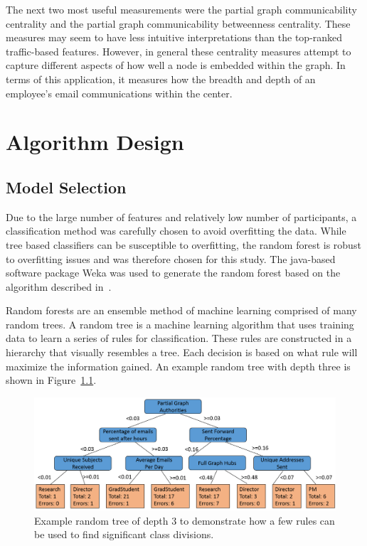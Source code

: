 \documentclass[12pt]{report}
\begin{document}
The next two most useful measurements were the partial graph communicability centrality and the partial graph communicability betweenness centrality.
These measures may seem to have less intuitive interpretations than the top-ranked traffic-based features.
However, in general these centrality measures attempt to capture different aspects of how well a node is embedded within the graph.
In terms of this application, it measures how the breadth and depth of an employee's email communications within the center.

\chapter{Algorithm Design} \label{Algorithm}
\section{Model Selection}
Due to the large number of features and relatively low number of participants, a classification method was carefully chosen to avoid overfitting the data.
While tree based classifiers can be susceptible to overfitting, the random forest is robust to overfitting issues and was therefore chosen for this study.
The java-based software package Weka was used to generate the random forest based on the algorithm described in~\cite{Breiman2001}.

Random forests are an ensemble method of machine learning comprised of many random trees.
A random tree is a machine learning algorithm that uses training data to learn a series of rules for classification.
These rules are constructed in a hierarchy that visually resembles a tree.
Each decision is based on what rule will maximize the information gained.
An example random tree with depth three is shown in Figure~\ref{fig:ex_tree}.

\begin{figure}[t]
    \centering
    \includegraphics[width=\columnwidth,trim={0mm 2.5mm 0mm 2mm},clip]{3_level_tree}
    \vspace{-15pt}
    \caption[Example random tree]{Example random tree of depth 3 to demonstrate how a few rules can be used to find significant class divisions.}
    \label{fig:ex_tree}
\end{figure}
\end{document}
